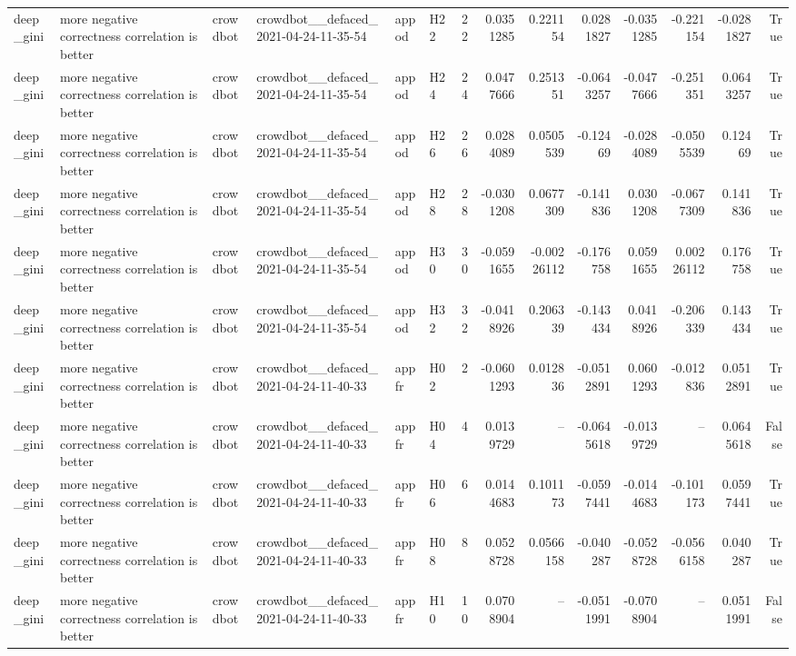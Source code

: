 \begin{longtable}{llllllrrrrrrrr}
deep\_gini & more negative correctness correlation is better & crowdbot & crowdbot\_\_defaced\_2021-04-24-11-35-54 & appod & H22 & 22 & 0.0351285 & 0.221154 & 0.0281827 & -0.0351285 & -0.221154 & -0.0281827 & True \\
deep\_gini & more negative correctness correlation is better & crowdbot & crowdbot\_\_defaced\_2021-04-24-11-35-54 & appod & H24 & 24 & 0.0477666 & 0.251351 & -0.0643257 & -0.0477666 & -0.251351 & 0.0643257 & True \\
deep\_gini & more negative correctness correlation is better & crowdbot & crowdbot\_\_defaced\_2021-04-24-11-35-54 & appod & H26 & 26 & 0.0284089 & 0.0505539 & -0.12469 & -0.0284089 & -0.0505539 & 0.12469 & True \\
deep\_gini & more negative correctness correlation is better & crowdbot & crowdbot\_\_defaced\_2021-04-24-11-35-54 & appod & H28 & 28 & -0.0301208 & 0.0677309 & -0.141836 & 0.0301208 & -0.0677309 & 0.141836 & True \\
deep\_gini & more negative correctness correlation is better & crowdbot & crowdbot\_\_defaced\_2021-04-24-11-35-54 & appod & H30 & 30 & -0.0591655 & -0.00226112 & -0.176758 & 0.0591655 & 0.00226112 & 0.176758 & True \\
deep\_gini & more negative correctness correlation is better & crowdbot & crowdbot\_\_defaced\_2021-04-24-11-35-54 & appod & H32 & 32 & -0.0418926 & 0.206339 & -0.143434 & 0.0418926 & -0.206339 & 0.143434 & True \\
deep\_gini & more negative correctness correlation is better & crowdbot & crowdbot\_\_defaced\_2021-04-24-11-40-33 & appfr & H02 & 2 & -0.0601293 & 0.012836 & -0.0512891 & 0.0601293 & -0.012836 & 0.0512891 & True \\
deep\_gini & more negative correctness correlation is better & crowdbot & crowdbot\_\_defaced\_2021-04-24-11-40-33 & appfr & H04 & 4 & 0.0139729 & -- & -0.0645618 & -0.0139729 & -- & 0.0645618 & False \\
deep\_gini & more negative correctness correlation is better & crowdbot & crowdbot\_\_defaced\_2021-04-24-11-40-33 & appfr & H06 & 6 & 0.0144683 & 0.101173 & -0.0597441 & -0.0144683 & -0.101173 & 0.0597441 & True \\
deep\_gini & more negative correctness correlation is better & crowdbot & crowdbot\_\_defaced\_2021-04-24-11-40-33 & appfr & H08 & 8 & 0.0528728 & 0.0566158 & -0.040287 & -0.0528728 & -0.0566158 & 0.040287 & True \\
deep\_gini & more negative correctness correlation is better & crowdbot & crowdbot\_\_defaced\_2021-04-24-11-40-33 & appfr & H10 & 10 & 0.0708904 & -- & -0.0511991 & -0.0708904 & -- & 0.0511991 & False \\

\end{longtable}
